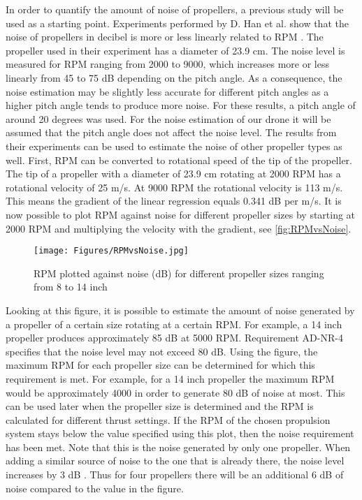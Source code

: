 In order to quantify the amount of noise of propellers, a previous study will be used as a starting point. Experiments performed by D. Han et al. show that the noise of propellers in decibel is more or less linearly related to RPM \cite{noiseVSrpm}. The propeller used in their experiment has a diameter of 23.9 cm. The noise level is measured for RPM ranging from 2000 to 9000, which increases more or less linearly from 45 to 75 dB depending on the pitch angle. As a consequence, the noise estimation may be slightly less accurate for different pitch angles as a higher pitch angle tends to produce more noise. For these results, a pitch angle of around 20 degrees was used. For the noise estimation of our drone it will be assumed that the pitch angle does not affect the noise level. The results from their experiments can be used to estimate the noise of other propeller types as well. First, RPM can be converted to rotational speed of the tip of the propeller. The tip of a propeller with a diameter of 23.9 cm rotating at 2000 RPM has a rotational velocity of 25 m/s. At 9000 RPM the rotational velocity is 113 m/s. This means the gradient of the linear regression equals 0.341 dB per m/s. It is now possible to plot RPM against noise for different propeller sizes by starting at 2000 RPM and multiplying the velocity with the gradient, see \autoref{fig:RPMvsNoise}.

\begin{figure}[h]
    \centering
    \texttt{[image: Figures/RPMvsNoise.jpg]}
    \caption{RPM plotted against noise (dB) for different propeller sizes ranging from 8 to 14 inch}
    \label{fig:RPMvsNoise}
\end{figure}

Looking at this figure, it is possible to estimate the amount of noise generated by a propeller of a certain size rotating at a certain RPM. For example, a 14 inch propeller produces approximately 85 dB at 5000 RPM. Requirement AD-NR-4 specifies that the noise level may not exceed 80 dB. Using the figure, the maximum RPM for each propeller size can be determined for which this requirement is met. For example, for a 14 inch propeller the maximum RPM would be approximately 4000 in order to generate 80 dB of noise at most. This can be used later when the propeller size is determined and the RPM is calculated for different thrust settings. If the RPM of the chosen propulsion system stays below the value specified using this plot, then the noise requirement has been met. Note that this is the noise generated by only one propeller. When adding a similar source of noise to the one that is already there, the noise level increases by 3 dB \cite{addupnoise}. Thus for four propellers there will be an additional 6 dB of noise compared to the value in the figure.

